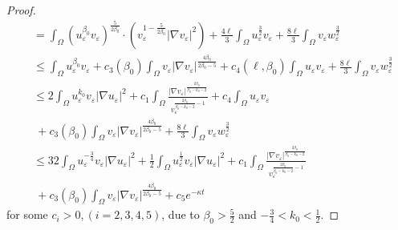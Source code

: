 \documentclass[12pt]{article}
\theoremstyle{plain}
\theoremstyle{definition}
\numberwithin{equation}{section}
\begin{document}
\begin{proof}
\begin{align}
        &= \int_\Omega (u_\varepsilon^{\beta_0}v_\varepsilon)^{\frac{5}{2\beta_0}}\cdot(v_\varepsilon^{1-\frac{5}{2\beta_0}}|\nabla v_\varepsilon|^{2})+\frac{4\ell}{3}\int_\Omega u_\varepsilon ^{\frac{3}{2}}v_\varepsilon+\frac{8\ell}{3}\int_\Omega v_\varepsilon w_\varepsilon^{\frac3 2}\nonumber\\
        &\leq \int_\Omega u_\varepsilon^{\beta_0}v_\varepsilon+c_3(\beta_0)\int_\Omega v_\varepsilon|\nabla v_\varepsilon|^{\frac{4\beta_0}{2\beta_0-5}}+c_4(\ell,\beta_0)\int_\Omega u_\varepsilon v_\varepsilon+\frac{8\ell}{3}\int_\Omega v_\varepsilon w_\varepsilon^{\frac3 2}\nonumber\\
        &\leq 2\int_{\Omega}u_\varepsilon^{k_0}v_\varepsilon|\nabla u_\varepsilon|^2+
        c_1\int_\Omega\frac{|\nabla v_\varepsilon|^{\frac{2\beta_0}{\beta_0-k_0-2}}}
        {v_\varepsilon^{\frac{2\beta_0}{\beta_0-k_0-2}-1}}
                 +c_4\int_{\Omega}u_\varepsilon v_\varepsilon\\
        &~+c_3(\beta_0)\int_\Omega v_\varepsilon|\nabla v_\varepsilon|^{\frac{4\beta_0}{2\beta_0-5}}+\frac{8\ell}{3}\int_\Omega v_\varepsilon w_\varepsilon^{\frac3 2}\nonumber\\
       &\leq 32 \int_\Omega u_\varepsilon^{-\frac{3}{4}}v_\varepsilon|\nabla u_\varepsilon|^2+
       \frac 12 \int_\Omega u_\varepsilon^{\frac{1}{2}}v_\varepsilon|\nabla u_\varepsilon|^2+
        c_1\int_\Omega\frac{|\nabla v_\varepsilon|^{\frac{2\beta_0}{\beta_0-k_0-2}}}
        {v_\varepsilon^{\frac{2\beta_0}{\beta_0-k_0-2}-1}}\nonumber\\
           &~+c_3(\beta_0)\int_\Omega v_\varepsilon|\nabla v_\varepsilon|^{\frac{4\beta_0}{2\beta_0-5}}+c_5e^{-\kappa t}\nonumber
\end{align}
for some $c_i>0, (i=2,3,4,5)$, due to $\beta_0>\frac 52$ and $-\frac 34<k_0<\frac 12$.


\end{proof}
\end{document}
